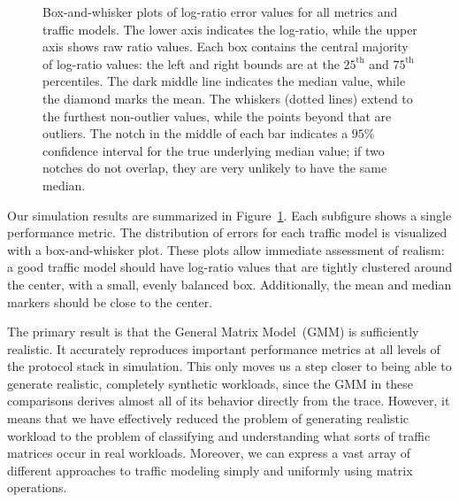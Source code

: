 \documentclass[conference]{IEEEtran}
\newcommand{\caps}[1]{{\small{#1}}}
\begin{document}
\begin{figure}
%
\caption{Box-and-whisker plots of log-ratio error values for all metrics and traffic models. The lower axis indicates the log-ratio, while the upper axis shows raw ratio values. Each box contains the central majority of log-ratio values: the left and right bounds are at the $25^\text{th}$ and $75^\text{th}$ percentiles. The dark middle line indicates the median value, while the diamond marks the mean. The whiskers (dotted lines) extend to the furthest non-outlier values, while the points beyond that are outliers. The notch in the middle of each bar indicates a $95\%$ confidence interval for the true underlying median value; if two notches do not overlap, they are very unlikely to have the same median.}
\label{fig:box-plots}
\end{figure}

Our simulation results are summarized in Figure~\ref{fig:box-plots}. Each subfigure shows a single performance metric. The distribution of errors for each traffic model is visualized with a box-and-whisker plot. These plots allow immediate assessment of realism: a good traffic model should have log-ratio values that are tightly clustered around the center, with a small, evenly balanced box. Additionally, the mean and median markers should be close to the center. 

The primary result is that the General Matrix Model~(\caps{GMM}) is sufficiently realistic. It accurately reproduces important performance metrics at all levels of the protocol stack in simulation. This only moves us a step closer to being able to generate realistic, completely synthetic workloads, since the \caps{GMM} in these comparisons  derives almost all of its behavior directly from the trace. However, it means that we have effectively reduced the problem of generating realistic workload to the problem of classifying and understanding what sorts of traffic matrices occur in real workloads. Moreover, we can express a vast array of different approaches to traffic modeling simply and uniformly using matrix operations.
\end{document}
